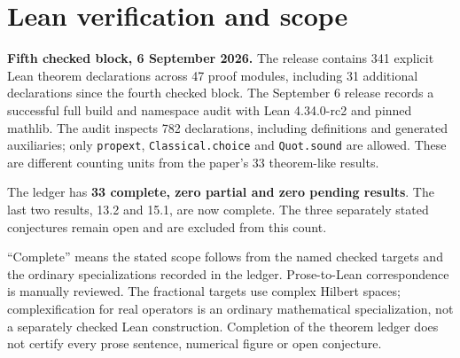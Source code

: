 \clearpage
\appendix
\section{Lean verification and scope}\label{sec:lean-status}
\noindent\textbf{Fifth checked block, 6 September 2026.}
The release contains 341 explicit Lean theorem declarations across 47 proof modules,
including 31 additional declarations since the fourth checked block. The September 6 release records a successful full
build and namespace audit with Lean 4.34.0-rc2 and pinned mathlib. The audit
inspects 782 declarations, including definitions and generated auxiliaries; only
\texttt{propext}, \texttt{Classical.choice} and \texttt{Quot.sound} are allowed.
These are different counting units from the paper's 33 theorem-like results.

The ledger has \textbf{33 complete, zero partial and zero pending results}.
The last two results, 13.2 and 15.1, are now complete. The three separately stated
conjectures remain open and are excluded from this count.

``Complete'' means the stated scope follows from the named checked targets
and the ordinary specializations recorded in the ledger. Prose-to-Lean correspondence
is manually reviewed. The fractional targets use complex Hilbert spaces;
complexification for real operators is an ordinary mathematical specialization,
not a separately checked Lean construction. Completion of the theorem ledger does
not certify every prose sentence, numerical figure or open conjecture.


